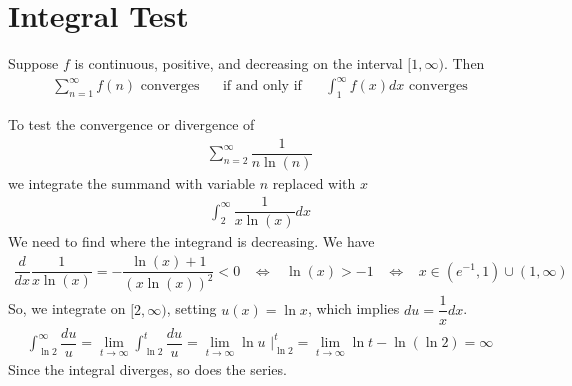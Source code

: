\section{Integral Test}

\begin{theorem}
Suppose $f$ is continuous, positive, and decreasing on the interval $[1, \infty)$. Then
\begin{align*}
    \sum_{n=1}^{\infty} f(n) \hspace{4pt} \text{converges} \hspace{20pt} \text{if and only if} \hspace{20pt} \int_{1}^{\infty} f(x) dx \hspace{4pt} \text{converges}
\end{align*}
\end{theorem}

\begin{example}
To test the convergence or divergence of 
\begin{align*}
    \sum_{n=2}^{\infty} \dfrac{1}{n \ln (n)}
\end{align*}
we integrate the summand with variable $n$ replaced with $x$
\begin{align*}
    \int_{2}^{\infty} \dfrac{1}{x \ln (x)} dx 
\end{align*}
We need to find where the integrand is decreasing. We have
\begin{align*}
    \dfrac{d}{dx} \dfrac{1}{x \ln (x)} = -\dfrac{\ln (x) + 1}{(x \ln (x))^{2}} < 0 \hspace{10pt} \Longleftrightarrow \hspace{10pt} \ln (x) > -1 \hspace{10pt} \Longleftrightarrow \hspace{10pt} x \in (e^{-1}, 1) \cup (1, \infty)
\end{align*}
So, we integrate on $[2, \infty)$, setting $u(x) = \ln x$, which implies $du = \dfrac{1}{x} dx$.
\begin{align*}
    \int_{\ln 2}^{\infty} \dfrac{du}{u} = \lim_{t \longrightarrow \infty} \int_{\ln 2}^{t} \dfrac{du}{u} = \lim_{t \longrightarrow \infty} \ln u \hspace{4pt} \Big|_{\ln 2}^{t} = \lim_{t \longrightarrow \infty} \ln t - \ln(\ln 2) = \infty
\end{align*}
Since the integral diverges, so does the series.
\end{example}